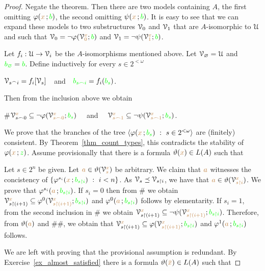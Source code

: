 \begin{proof}
  Negate the theorem. 
  Then there are two models containing $A$, the first omitting $\varphi({\color{brown} x}\,;{\color{green} b})$, the second omitting $\psi({\color{brown} x}\,;{\color{green} b})$.
  It is easy to see that we can expand these models to two substructures $\EuScript V_0$ and $\EuScript V_1$ that are $A$-isomorphic to $\EuScript U$ and such that $\EuScript V_0=\neg\varphi(\EuScript V_0^{\color{brown} x};{\color{green} b})$ and $\EuScript V_1=\neg\psi(\EuScript V_1^{\color{brown} x};{\color{green} b})$.

  Let $f_i:\EuScript U\to\EuScript V_i$ be the $A$-isomorphisms mentioned above. 
  Let $\EuScript V_\varnothing=\EuScript U$ and ${\color{green} b_\varnothing}={\color{green} b}$.
  Define inductively for every $s\in 2^{<\omega}$ 

  \hfil$\EuScript V_{s^\frown i}=f_i[\EuScript V_s]$\ \ and\ \ ${\color{green} b_{s\frown i}}=f_i({\color{green} b_s})$.

  Then from the inclusion above we obtain

  \#\hfil$\EuScript V_{s\frown0}^{{\color{brown} x}}\subseteq\neg\varphi(\EuScript V_{s\frown0}^{\color{brown} x};{\color{green} b_s})$ \ \ and \ \  $\EuScript V_{s\frown1}^{\color{brown} x}\subseteq\neg\psi(\EuScript V_{s\frown1}^{\color{brown} x};{\color{green} b_s})$.

  We prove that the branches of the tree $\<\phi({\mr x}\,;{\gr b_s})\ :\  s\in2^{<\omega}\>$ are (finitely) consistent. 
  By Theorem~\ref{thm_count_types}, this contradicts the stability of $\varphi({\color{brown} x}\,;{\color{green} z})$.
  Assume provisionally that there is a formula $\vartheta({\color{brown} x})\in L(A)$ such that
  
  
  Let $s\in2^n$ be given.
  Let ${\color{brown} a}\in\vartheta(\EuScript V_s^{\color{brown} x})$ be arbitrary. We claim that ${\color{brown} a}$ witnesses the concistency of $\{\phi^{s_i}({\mr x}\,;{\gr b_{s\restriction i}})\ :\ i<n\}$.
  As $\EuScript V_s\preceq\EuScript V_{s\restriction i}$, we have that ${\color{brown} a}\in\vartheta(\EuScript V_{s\restriction i}^{\color{brown} x})$.
  We prove that $\varphi^{s_i}({\color{brown} a}\,;{\color{green} b_{s\restriction i}})$.
  If $s_i=0$ then from \# we obtain $\EuScript V_{s\restriction(i+1)}^{{\color{brown} x}}\subseteq\varphi^0(\EuScript V_{s\restriction(i+1)}^{\color{brown} x};{\color{green} b_{s\restriction i}})$ and $\varphi^0({\color{brown} a}\,;{\color{green} b_{s\restriction i}})$ follows by elementarity.
  If $s_i=1$, from the second inclusion in \# we obtain $\EuScript V_{s\restriction(i+1)}^{{\color{brown} x}}\subseteq\neg\psi(\EuScript V_{s\restriction(i+1)}^{\color{brown} x};{\color{green} b_{s\restriction i}})$.
  Therefore, from $\vartheta({\color{brown} a})$ and \#\#, we obtain that $\EuScript V_{s\restriction(i+1)}^{{\color{brown} x}}\subseteq\varphi(\EuScript V_{s\restriction(i+1)}^{\color{brown} x};{\color{green} b_{s\restriction i}})$ and $\varphi^1({\color{brown} a}\,;{\color{green} b_{s\restriction i}})$ follows.

  We are left with proving that the provisional assumption is redundant.
  By Exercise~\ref{ex_almost_satisfied} there is a formula $\vartheta({\color{brown}\bar x})\in L(A)$ such that


\end{proof}
